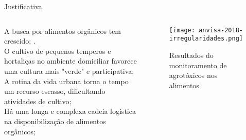 \begin{frame}[t]{Justificativa} 
    \transdissolve[duration=0.5]
    \newcommand\vertspacejust{0.12cm}
        \begin{columns}[t]
                    \justifying
                    A busca por alimentos orgânicos tem crescido;  \cite{sebrae:organicos}. \\ \vspace*{\vertspacejust}
                    O cultivo de pequenos temperos e hortaliças no ambiente domiciliar favorece uma cultura mais "verde" e participativa; \cite{G1:pequenoagricultor} \\ \vspace*{\vertspacejust}
                    A rotina da vida urbana torna o tempo um recurso escasso, dificultando atividades de cultivo; \cite{G1:3xtransito} \\ \vspace*{\vertspacejust}
                    Há uma longa e complexa cadeia logística na disponibilização de alimentos orgânicos; \cite{silva:cadeiaprodutiva}  \\ \vspace*{\vertspacejust}
            
            \begin{center}
                \begin{figure}
                    \vspace{-1cm}
                    \texttt{[image: anvisa-2018-irregularidades.png]}
                    \caption{\centering Resultados do monitoramento de agrotóxicos nos alimentos \cite{ANVISA-PARA:online}}
                \end{figure}
            \end{center}
        \end{columns}
\end{frame}

